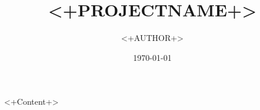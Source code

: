 \documentclass[t]{beamer}
\title{<+PROJECTNAME+>}
\author{<+AUTHOR+>}
\date{\today}
\begin{document}
\begin{frame}
  \titlepage
\end{frame}
\begin{frame}
  \tableofcontents
\end{frame}

<+Content+>
\end{document}
